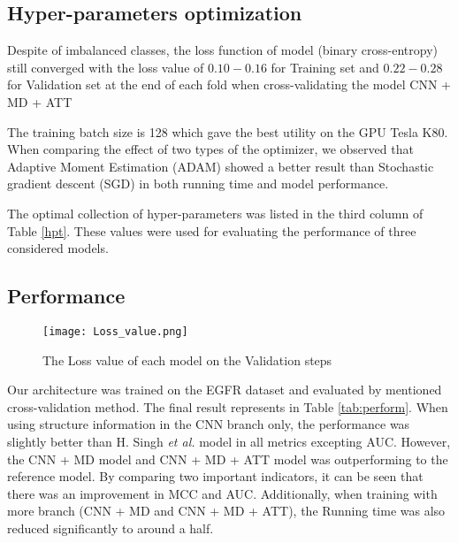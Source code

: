 \documentclass[conference]{IEEEtran}
\begin{document}
\subsection{Hyper-parameters optimization}
Despite of imbalanced classes, the loss function of model (binary cross-entropy) still converged with the loss value of $0.10 - 0.16$ for Training set and $0.22 -0.28$ for Validation set at the end of each fold when cross-validating the model CNN + MD + ATT 



The training batch size is 128 which gave the best utility on the GPU Tesla K80. When comparing the effect of two types of the optimizer, we observed that Adaptive Moment Estimation (ADAM) showed a better result than Stochastic gradient descent (SGD) in both running time and model performance. 

The optimal collection of hyper-parameters was listed in the third column of Table \ref{hpt}. These values were used for evaluating the performance of three considered models.

\subsection{Performance}
\begin{figure*}[htbp]
    \centering
    \texttt{[image: Loss\_value.png]}
    \caption{The Loss value of each model on the Validation steps}
    \label{fig:arch}
\end{figure*}

Our architecture was trained on the EGFR dataset and evaluated by mentioned cross-validation method. The final result represents in Table \ref{tab:perform}. When using structure information in the CNN branch only, the performance was slightly better than H. Singh \textit{et al.} model in all metrics excepting AUC. However, the CNN + MD model and CNN + MD + ATT model was outperforming to the reference model. By comparing two important indicators, it can be seen that there was an improvement in MCC and AUC. Additionally, when training with more branch (CNN + MD and CNN + MD + ATT), the Running time was also reduced significantly to around a half.
\end{document}
